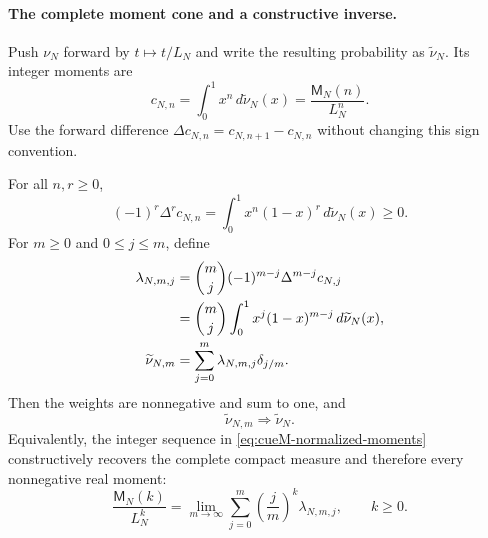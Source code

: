 \paragraph{The complete moment cone and a constructive inverse.}
Push $\nu_N$ forward by $t\mapsto t/L_N$ and write the resulting probability as
$\widetilde\nu_N$.  Its integer moments are
\begin{equation}
 c_{N,n}=\int_0^1x^n\,d\widetilde\nu_N(x)
        =\frac{\mathsf M_N(n)}{L_N^n}.
 \label{eq:cueM-normalized-moments}
\end{equation}
Use the forward difference
$\Delta c_{N,n}=c_{N,n+1}-c_{N,n}$ without changing this sign convention.

\begin{theorem}
\label{thm:cueM-Hausdorff-Bernstein}
For all $n,r\geq0$,
\begin{equation}
 (-1)^r\Delta^r c_{N,n}
 =\int_0^1x^n(1-x)^r\,d\widetilde\nu_N(x)\geq0.
 \label{eq:cueM-Hausdorff-differences}
\end{equation}
For $m\geq0$ and $0\leq j\leq m$, define
\begin{align}
 \lambda_{N,m,j}
 &=\binom mj(-1)^{m-j}\Delta^{m-j}c_{N,j} \notag\\
 &=\binom mj\int_0^1x^j(1-x)^{m-j}\,d\widetilde\nu_N(x),
 \label{eq:cueM-Bernstein-weights}\\
 \widetilde\nu_{N,m}&=\sum_{j=0}^{m}\lambda_{N,m,j}\delta_{j/m}.
 \label{eq:cueM-Bernstein-discrete}
\end{align}
Then the weights are nonnegative and sum to one, and
\begin{equation}
 \widetilde\nu_{N,m}\Rightarrow\widetilde\nu_N.
 \label{eq:cueM-Bernstein-limit}
\end{equation}
Equivalently, the integer sequence in \eqref{eq:cueM-normalized-moments} constructively
recovers the complete compact measure and therefore every nonnegative real moment:
\begin{equation}
 \frac{\mathsf M_N(k)}{L_N^k}
 =\lim_{m\to\infty}\sum_{j=0}^{m}
   \left(\frac jm\right)^k\lambda_{N,m,j},
 \qquad k\geq0.
 \label{eq:cueM-fractional-recovery}
\end{equation}
\end{theorem}

